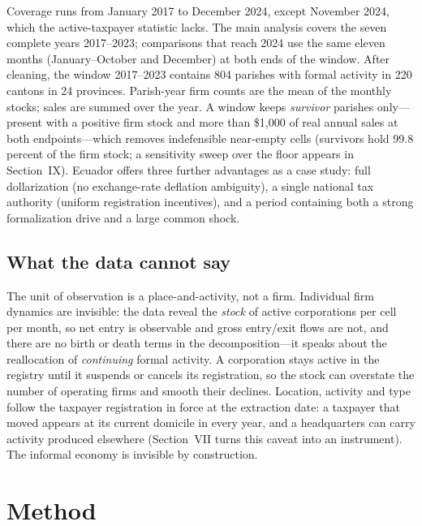 \documentclass[conference]{IEEEtran}
\begin{document}
Coverage runs from January 2017 to December 2024, except November 2024,
which the active-taxpayer statistic lacks. The main analysis covers the
seven complete years 2017--2023; comparisons that reach 2024 use the same
eleven months (January--October and December) at both ends of the window.
After cleaning, the window 2017--2023 contains 804 parishes with formal
activity in 220 cantons in 24 provinces. Parish-year firm counts are the
mean of the monthly stocks; sales are summed over the year. A window
keeps \textit{survivor} parishes only---present with a positive firm
stock and more than \$1{,}000 of real annual sales at both
endpoints---which removes indefensible near-empty cells (survivors hold
99.8 percent of the firm stock; a sensitivity sweep over the floor appears
in Section~IX). Ecuador offers three further advantages as a case study:
full dollarization (no exchange-rate deflation ambiguity), a single
national tax authority (uniform registration incentives), and a period
containing both a strong formalization drive and a large common shock.

\subsection{What the data cannot say}

The unit of observation is a place-and-activity, not a firm. Individual
firm dynamics are invisible: the data reveal the \textit{stock} of active
corporations per cell per month, so net entry is observable and gross
entry/exit flows are not, and there are no birth or death terms in the
decomposition---it speaks about the reallocation of \textit{continuing}
formal activity. A corporation stays active in the registry until it
suspends or cancels its registration, so the stock can overstate the
number of operating firms and smooth their declines. Location, activity
and type follow the taxpayer registration in force at the extraction
date: a taxpayer that moved appears at its current domicile in every
year, and a headquarters can carry activity produced elsewhere
(Section~VII turns this caveat into an instrument). The informal economy
is invisible by construction.

\section{Method}
\end{document}
